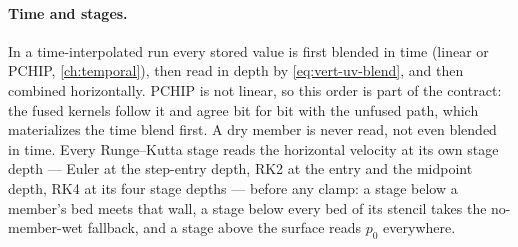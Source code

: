 \paragraph{Time and stages.} In a time-interpolated run every stored value is first blended in time
(linear or PCHIP, \cref{ch:temporal}), then read in depth by \cref{eq:vert-uv-blend}, and then combined
horizontally. PCHIP is not linear, so this order is part of the contract: the fused kernels follow it and
agree bit for bit with the unfused path, which materializes the time blend first. A dry member is never
read, not even blended in time. Every Runge--Kutta stage reads the horizontal velocity at its own stage
depth --- Euler at the step-entry depth, RK2 at the entry and the midpoint depth, RK4 at its four stage
depths --- before any clamp: a stage below a member's bed meets that wall, a stage below every bed of its
stencil takes the no-member-wet fallback, and a stage above the surface reads $p_0$ everywhere.


